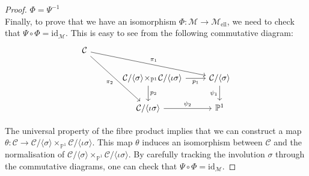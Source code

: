 \documentclass{amsart}
\newcommand{\calC}{\mathcal{C}}
\newcommand{\calM}{\mathcal{M}}
\newcommand{\mell}{\mathcal{M}_{\text{ell}}}
\numberwithin{equation}{section}
\theoremstyle{definition}
\theoremstyle{remark}
\begin{document}
\begin{proof}
\underline{$\Phi=\Psi^{-1}$}\\

Finally, to prove that we have an isomorphism $\Phi:\calM\rightarrow\mell$, we need to check that $\Psi\circ\Phi=\mathrm{id}_{\calM}$. This is easy to see from the following commutative diagram:
\[\begin{tikzcd}
\calC \arrow[rrd, "\pi_1"] \arrow[rdd, "\pi_2"'] &                                                                                                                   &                                                 \\
                                                 & \quad\calC/\langle\sigma\rangle\!\times_{\mathbb{P}^1}\!\calC/\langle\iota\sigma\rangle \arrow[r, "p_1"'] \arrow[d, "p_2"] & \calC/\langle\sigma\rangle \arrow[d, "\psi_1"'] \\
                                                 &\calC/\langle\iota\sigma\rangle \arrow[r, "\psi_2"]                                                               & \mathbb{P}^1                                   
\end{tikzcd}\]

The universal property of the fibre product implies that we can construct a map $\theta:\calC\rightarrow\calC/\langle\sigma\rangle\times_{\mathbb{P}^1}\calC/\langle\iota\sigma\rangle$. This map $\theta$ induces an isomorphism between $\calC$ and the normalisation of $\calC/\langle\sigma\rangle\times_{\mathbb{P}^1}\calC/\langle\iota\sigma\rangle$. By carefully tracking the involution $\sigma$ through the commutative diagrams, one can check that $\Psi\circ\Phi=\mathrm{id}_{\calM}$.
\end{proof}
\end{document}

